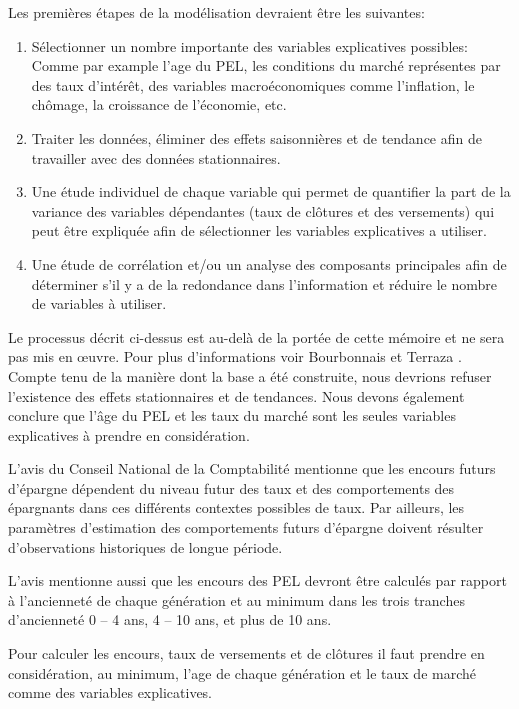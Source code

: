 \documentclass[12pt, a4paper]{book}
\begin{document}
Les premières étapes de la modélisation devraient être les suivantes:
\begin{enumerate}
\item Sélectionner un nombre importante des variables explicatives possibles: Comme par example l'age du PEL, les conditions du marché représentes par des taux d'intérêt, des variables macroéconomiques comme l'inflation, le chômage, la croissance de l'économie, etc. 

\item Traiter les données, éliminer des effets saisonnières et de tendance afin de travailler avec des données stationnaires. 

\item Une étude individuel de chaque variable qui permet de quantifier la part de la variance des variables dépendantes (taux de clôtures et des versements) qui peut être expliquée afin de sélectionner les variables explicatives a utiliser. 

\item Une étude de corrélation et/ou un analyse des composants principales afin de déterminer  s'il y a de la redondance dans l'information et réduire le nombre de variables à utiliser.


\end{enumerate}

Le processus décrit ci-dessus est au-delà de la portée de cette mémoire et ne sera pas mis en œuvre. Pour plus d'informations voir Bourbonnais et Terraza \cite{BT}. Compte tenu de la manière dont la base a été construite, nous devrions refuser l'existence des effets stationnaires et de tendances. Nous devons également conclure que l'âge du PEL  et les taux du marché sont les seules variables explicatives à prendre en considération. 

L'avis du Conseil National de la Comptabilité  \cite{CNC1} mentionne que les encours futurs d'épargne  dépendent du niveau futur des taux et des comportements des épargnants dans ces différents contextes possibles de taux. Par ailleurs, les paramètres d'estimation des comportements futurs d'épargne doivent résulter d'observations historiques de longue période.

L'avis mentionne aussi que les encours des PEL devront être calculés par rapport à l'ancienneté de chaque génération  et au minimum dans les trois tranches d'ancienneté 0 – 4 ans, 4 – 10 ans, et plus de 10 ans.

Pour calculer les encours, taux de versements et de clôtures il faut prendre en considération, au minimum, l'age de chaque génération et le taux de marché comme des variables explicatives. 
\end{document}
